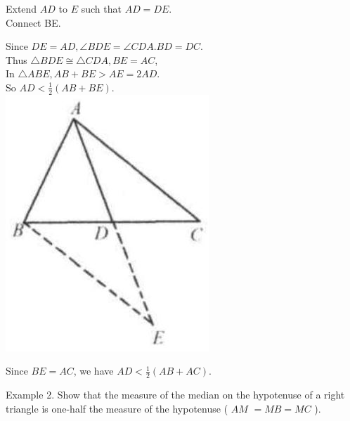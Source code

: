 \documentclass[10pt]{article}
\begin{document}
Extend \(A D\) to \(E\) such that \(A D=D E\).\\
Connect BE.

Since \(D E=A D, \angle B D E=\angle C D A . B D=D C\).\\
Thus \(\triangle B D E \cong \triangle C D A, B E=A C\),\\
In \(\triangle A B E, A B+B E>A E=2 A D\).\\
So \(A D<\frac{1}{2}(A B+B E)\).\\
\includegraphics[max width=\textwidth, center]{2025_04_17_97bc1f7e44d93c271a88g-023(2)}

Since \(B E=A C\), we have \(A D<\frac{1}{2}(A B+A C)\).


Example 2. Show that the measure of the median on the hypotenuse of a right triangle is one-half the measure of the hypotenuse ( \(A M\) \(=M B=M C\) ).
\end{document}
